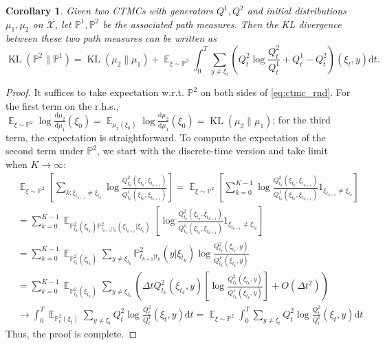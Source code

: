 \documentclass{article}
\newtheorem{corollary}{Corollary}
\theoremstyle{remark}
\newcommand{\ro}[1]{\left(#1\right)} %
\newcommand{\sq}[1]{\left[#1\right]} %
\renewcommand{\P}{\mathbb{P}}
\newcommand{\E}{\operatorname{\mathbb{E}}}
\renewcommand{\d}{\mathrm{d}}
\newcommand{\de}[2]{\frac{\mathrm{d}#1}{\mathrm{d}#2}} %
\newcommand{\kl}{\operatorname{KL}}
\newcommand{\cX}{\mathcal{X}}
\begin{document}
%
\begin{corollary}
Given two CTMCs with generators $Q^1,Q^2$ and initial distributions $\mu_1,\mu_2$ on $\cX$, let $\P^1,\P^2$ be the associated path measures. Then the KL divergence between these two path measures can be written as
\begin{equation*}
    \kl(\P^2\|\P^1)=\kl(\mu_2\|\mu_1)+\E_{\xi\sim\P^2}\int_0^T\sum_{y\ne\xi_t}\ro{Q^2_t\log\frac{Q^2_t}{Q^1_t}+Q^1_t-Q^2_t}(\xi_t,y)\d t.
\end{equation*}
\label{lem:ctmc_kl}
\end{corollary}

\begin{proof}
It suffices to take expectation w.r.t. $\P^2$ on both sides of \cref{eq:ctmc_rnd}. For the first term on the r.h.s., $\E_{\xi\sim\P^2}\log\de{\mu_2}{\mu_1}(\xi_0)=\E_{\mu_2(\xi_0)}\log\de{\mu_2}{\mu_1}(\xi_0)=\kl(\mu_2\|\mu_1)$; for the third term, the expectation is straightforward. To compute the expectation of the second term under $\P^2$, we start with the discrete-time version and take limit when $K\to\infty$:
\begin{align*}
    &\E_{\xi\sim\P^2}\sq{\sum_{k:\xi_{t_{k+1}}\ne\xi_{t_k}}\log\frac{Q^2_{t_k}(\xi_{t_k},\xi_{t_{k+1}})}{Q^1_{t_k}(\xi_{t_k},\xi_{t_{k+1}})}}=\E_{\xi\sim\P^2}\sq{\sum_{k=0}^{K-1}\log\frac{Q^2_{t_k}(\xi_{t_k},\xi_{t_{k+1}})}{Q^1_{t_k}(\xi_{t_k},\xi_{t_{k+1}})}1_{\xi_{t_{k+1}}\ne\xi_{t_k}}}\\
    &=\sum_{k=0}^{K-1}\E_{\P^2_{t_k}(\xi_{t_k})\P^2_{t_{k+1}|t_k}(\xi_{t_{k+1}}|\xi_{t_k})}\sq{\log\frac{Q^2_{t_k}(\xi_{t_k},\xi_{t_{k+1}})}{Q^1_{t_k}(\xi_{t_k},\xi_{t_{k+1}})}1_{\xi_{t_{k+1}}\ne\xi_{t_k}}}\\
    &=\sum_{k=0}^{K-1}\E_{\P^2_{t_k}(\xi_{t_k})}\sum_{y\ne\xi_{t_k}}\P^2_{t_{k+1}|t_k}(y|\xi_{t_k})\log\frac{Q^2_{t_k}(\xi_{t_k},y)}{Q^1_{t_k}(\xi_{t_k},y)}\\
    &=\sum_{k=0}^{K-1}\E_{\P^2_{t_k}(\xi_{t_k})}\sum_{y\ne\xi_{t_k}}\ro{\Delta tQ^2_{t_k}(\xi_{t_k},y)\sq{\log\frac{Q^2_{t_k}(\xi_{t_k},y)}{Q^1_{t_k}(\xi_{t_k},y)}}+O(\Delta t^2)}\\
    &\to\int_0^T\E_{\P^2_t(\xi_t)}\sum_{y\ne\xi_t}Q^2_t\log\frac{Q^2_t}{Q^1_t}(\xi_t,y)\d t=\E_{\xi\sim\P^2}\int_0^T\sum_{y\ne\xi_t}Q^2_t\log\frac{Q^2_t}{Q^1_t}(\xi_t,y)\d t
\end{align*}
Thus, the proof is complete.
\end{proof}

%
%
%
%
%
%
%
\end{document}
